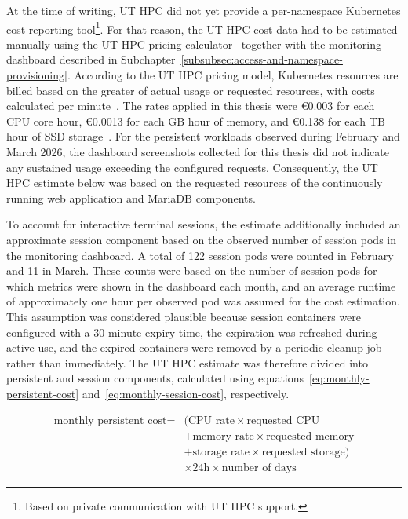 At the time of writing, UT HPC did not yet provide a per-namespace Kubernetes cost reporting tool\footnote{Based on private communication with UT HPC support.}.
For that reason, the UT HPC cost data had to be estimated manually using the UT HPC pricing calculator~\cite{ut_hpc_calculate_your_cost} together with the monitoring dashboard described in Subchapter~\ref{subsubsec:access-and-namespace-provisioning}.
According to the UT HPC pricing model, Kubernetes resources are billed based on the greater of actual usage or requested resources, with costs calculated per minute~\cite{ut_hpc_calculate_your_cost}.
The rates applied in this thesis were €0.003 for each CPU core hour, €0.0013 for each GB hour of memory, and €0.138 for each TB hour of SSD storage~\cite{ut_hpc_calculate_your_cost}.
For the persistent workloads observed during February and March 2026, the dashboard screenshots collected for this thesis did not indicate any sustained usage exceeding the configured requests.
Consequently, the UT HPC estimate below was based on the requested resources of the continuously running web application and MariaDB components.

To account for interactive terminal sessions, the estimate additionally included an approximate session component based on the observed number of session pods in the monitoring dashboard.
A total of 122 session pods were counted in February and 11 in March.
These counts were based on the number of session pods for which metrics were shown in the dashboard each month, and an average runtime of approximately one hour per observed pod was assumed for the cost estimation.
This assumption was considered plausible because session containers were configured with a 30-minute expiry time, the expiration was refreshed during active use, and the expired containers were removed by a periodic cleanup job rather than immediately.
The UT HPC estimate was therefore divided into persistent and session components, calculated using equations~\ref{eq:monthly-persistent-cost} and~\ref{eq:monthly-session-cost}, respectively.

\begin{equation}
  \begin{aligned}
    \text{monthly persistent cost} ={}& (\text{CPU rate} \times \text{requested CPU} \\
    &+ \text{memory rate} \times \text{requested memory} \\
    &+ \text{storage rate} \times \text{requested storage}) \\
    &\times 24\text{h} \times \text{number of days}
  \end{aligned}
  \label{eq:monthly-persistent-cost}
\end{equation}

